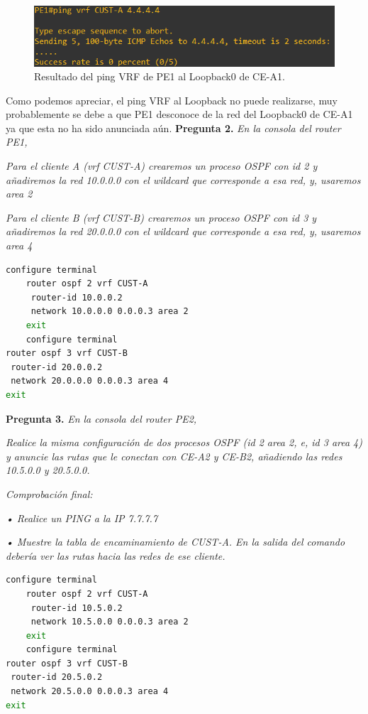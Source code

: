 \documentclass[a4paper, 12pt]{report}
\begin{document}
\begin{figure}[H]
	\centering
	\includegraphics[scale=0.7]{pingVRFtoLoopback.png}
	\caption{Resultado del ping VRF de PE1 al Loopback0 de CE-A1.}
	\label{fig:pingVRFtoLoopback}
\end{figure}

Como podemos apreciar, el ping VRF al Loopback no puede realizarse, muy probablemente se debe a que PE1 desconoce de la red del Loopback0 de CE-A1 ya que esta no ha sido anunciada aún.
\newpage
\textbf{Pregunta 2.}
\textit{En la consola del router PE1,}

\textit{Para el cliente A (vrf CUST-A) crearemos un proceso OSPF con id 2 y añadiremos la red
10.0.0.0 con el wildcard que corresponde a esa red, y, usaremos area 2}

\textit{Para el cliente B (vrf CUST-B) crearemos un proceso OSPF con id 3 y añadiremos la red
20.0.0.0 con el wildcard que corresponde a esa red, y, usaremos area 4}


\begin{lstlisting}[language=bash, caption={Configuración en PE1 para recibir las Loopbacks de los clientes}]
	configure terminal
	router ospf 2 vrf CUST-A
	 router-id 10.0.0.2
	 network 10.0.0.0 0.0.0.3 area 2
	exit
	configure terminal
router ospf 3 vrf CUST-B
 router-id 20.0.0.2
 network 20.0.0.0 0.0.0.3 area 4
exit
\end{lstlisting}
\newpage
\textbf{Pregunta 3.}
\textit{En la consola del router PE2,}

\textit{Realice la misma configuración de dos procesos OSPF (id 2 area 2, e, id 3 area 4) y
anuncie las rutas que le conectan con CE-A2 y CE-B2, añadiendo las redes 10.5.0.0 y
20.5.0.0.}

\textit{Comprobación final:}

\textit{• Realice un PING a la IP 7.7.7.7}

\textit{• Muestre la tabla de encaminamiento de CUST-A. En la salida del comando debería ver
las rutas hacia las redes de ese cliente.}

\begin{lstlisting}[language=bash, caption={Configuración en PE2 para recibir las Loopbacks de los clientes}]
	configure terminal
	router ospf 2 vrf CUST-A
	 router-id 10.5.0.2
	 network 10.5.0.0 0.0.0.3 area 2
	exit
	configure terminal
router ospf 3 vrf CUST-B
 router-id 20.5.0.2
 network 20.5.0.0 0.0.0.3 area 4
exit
\end{lstlisting}
\end{document}
